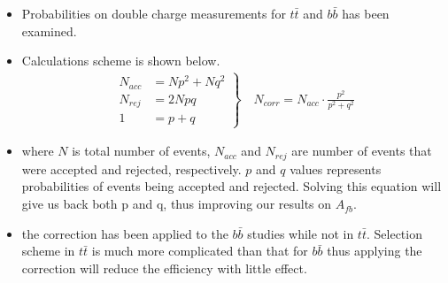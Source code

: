 \documentclass[preprint]{elsarticle}
\begin{document}
\begin{itemize}
  \begin{itemize}
  \item Probabilities on double charge measurements for $t\bar{t}$ and $b\bar{b}$ has been examined.
  \item Calculations scheme is shown below.
    \begin{align}
      \left.
      \begin{aligned}
        N_{acc} &= Np^2 + Nq^2\\
        N_{rej} &= 2Npq\\
        1 &= p + q
      \end{aligned}
      \right\}
      \quad N_{corr} = N_{acc} \cdot \frac{p^2}{p^2 + q^2}
    \end{align}
  \label{eq:pq-meth}
  \item where $N$ is total number of events, $N_{acc}$ and $N_{rej}$ are number of events that were accepted and rejected, respectively. $p$ and $q$ values represents probabilities of events being accepted and rejected. Solving this equation will give us back both p and q, thus improving our results on $A_{fb}$.
  \item the correction has been applied to the $b\bar{b}$ studies while not in $t\bar{t}$. Selection scheme in $t\bar{t}$ is much more complicated than that for $b\bar{b}$ thus applying the correction will reduce the efficiency with little effect.
       
  \end{itemize}
  
 \end{itemize}







\end{document}
